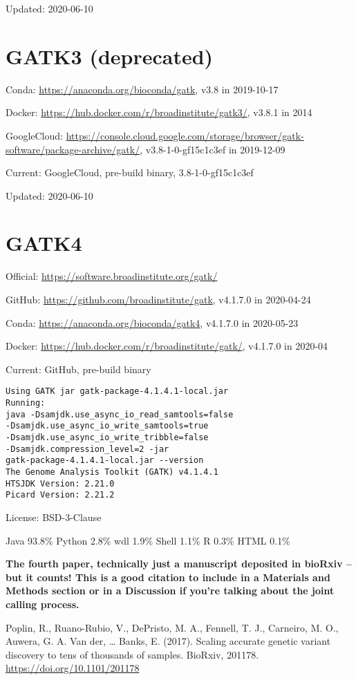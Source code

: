 \documentclass[]{article}
\begin{document}
Updated: 2020-06-10


\section{GATK3 (deprecated)}

Conda: \url{https://anaconda.org/bioconda/gatk}, v3.8 in 2019-10-17

Docker: \url{https://hub.docker.com/r/broadinstitute/gatk3/}, v3.8.1 in 2014

GoogleCloud: \url{https://console.cloud.google.com/storage/browser/gatk-software/package-archive/gatk/}, v3.8-1-0-gf15c1c3ef in 2019-12-09

Current: GoogleCloud, pre-build binary, 3.8-1-0-gf15c1c3ef

Updated: 2020-06-10

\section{GATK4}

Official: \url{https://software.broadinstitute.org/gatk/}

GitHub: \url{https://github.com/broadinstitute/gatk}, v4.1.7.0 in 2020-04-24

Conda: \url{https://anaconda.org/bioconda/gatk4}, v4.1.7.0 in 2020-05-23

Docker: \url{https://hub.docker.com/r/broadinstitute/gatk/}, v4.1.7.0 in 2020-04

Current: GitHub, pre-build binary

\begin{verbatim}
Using GATK jar gatk-package-4.1.4.1-local.jar
Running:
java -Dsamjdk.use_async_io_read_samtools=false
-Dsamjdk.use_async_io_write_samtools=true
-Dsamjdk.use_async_io_write_tribble=false
-Dsamjdk.compression_level=2 -jar 
gatk-package-4.1.4.1-local.jar --version
The Genome Analysis Toolkit (GATK) v4.1.4.1
HTSJDK Version: 2.21.0
Picard Version: 2.21.2
\end{verbatim}

License: BSD-3-Clause

Java 93.8\% Python 2.8\% wdl 1.9\% Shell 1.1\% R 0.3\% HTML 0.1\%

\textbf{The fourth paper, technically just a manuscript deposited in bioRxiv -- but it counts! This is a good citation to include in a Materials and Methods section or in a Discussion if you're talking about the joint calling process.}

Poplin, R., Ruano-Rubio, V., DePristo, M. A., Fennell, T. J., Carneiro, M. O., Auwera, G. A. Van der, … Banks, E. (2017). Scaling accurate genetic variant discovery to tens of thousands of samples. BioRxiv, 201178. \url{https://doi.org/10.1101/201178}
\end{document}
